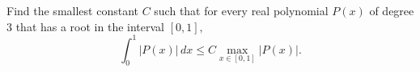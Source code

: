 Find the smallest constant $C$ such that for every real polynomial $P(x)$ of degree $3$ that has a root in the interval $[0,1],$
\[\int_0^1|P(x)|\,dx\le C\max_{x\in[0,1]}|P(x)|.\]